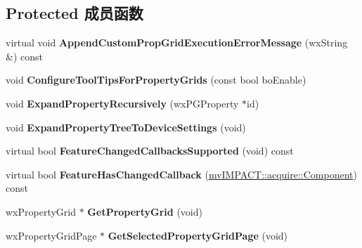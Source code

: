 \subsection*{Protected 成员函数}
\begin{DoxyCompactItemize}
\item 
\hypertarget{class_prop_grid_frame_base_a9b5bf0e5c31e064c87a653d030d3e021}{virtual void {\bfseries Append\+Custom\+Prop\+Grid\+Execution\+Error\+Message} (wx\+String \&) const }\label{class_prop_grid_frame_base_a9b5bf0e5c31e064c87a653d030d3e021}

\item 
\hypertarget{class_prop_grid_frame_base_ae594c1b6714229567d52ca4349fbc805}{void {\bfseries Configure\+Tool\+Tips\+For\+Property\+Grids} (const bool bo\+Enable)}\label{class_prop_grid_frame_base_ae594c1b6714229567d52ca4349fbc805}

\item 
\hypertarget{class_prop_grid_frame_base_a57db974b23c338c37b16c08b63cbfd07}{void {\bfseries Expand\+Property\+Recursively} (wx\+P\+G\+Property $\ast$id)}\label{class_prop_grid_frame_base_a57db974b23c338c37b16c08b63cbfd07}

\item 
\hypertarget{class_prop_grid_frame_base_af4cb34e1cb6bd12f518889e507906b29}{void {\bfseries Expand\+Property\+Tree\+To\+Device\+Settings} (void)}\label{class_prop_grid_frame_base_af4cb34e1cb6bd12f518889e507906b29}

\item 
\hypertarget{class_prop_grid_frame_base_a98b84b0161f8b0a68612c924b2ac6ea8}{virtual bool {\bfseries Feature\+Changed\+Callbacks\+Supported} (void) const }\label{class_prop_grid_frame_base_a98b84b0161f8b0a68612c924b2ac6ea8}

\item 
\hypertarget{class_prop_grid_frame_base_a0b0149fe9dcc6c3725f9f6037543d607}{virtual bool {\bfseries Feature\+Has\+Changed\+Callback} (\hyperlink{classmv_i_m_p_a_c_t_1_1acquire_1_1_component}{mv\+I\+M\+P\+A\+C\+T\+::acquire\+::\+Component}) const }\label{class_prop_grid_frame_base_a0b0149fe9dcc6c3725f9f6037543d607}

\item 
\hypertarget{class_prop_grid_frame_base_a5f1342755ca6de1ef9588c8f13f134a2}{wx\+Property\+Grid $\ast$ {\bfseries Get\+Property\+Grid} (void)}\label{class_prop_grid_frame_base_a5f1342755ca6de1ef9588c8f13f134a2}

\item 
\hypertarget{class_prop_grid_frame_base_a49596726a654017a03afae5796d2051d}{wx\+Property\+Grid\+Page $\ast$ {\bfseries Get\+Selected\+Property\+Grid\+Page} (void)}\label{class_prop_grid_frame_base_a49596726a654017a03afae5796d2051d}


\end{DoxyCompactItemize}
